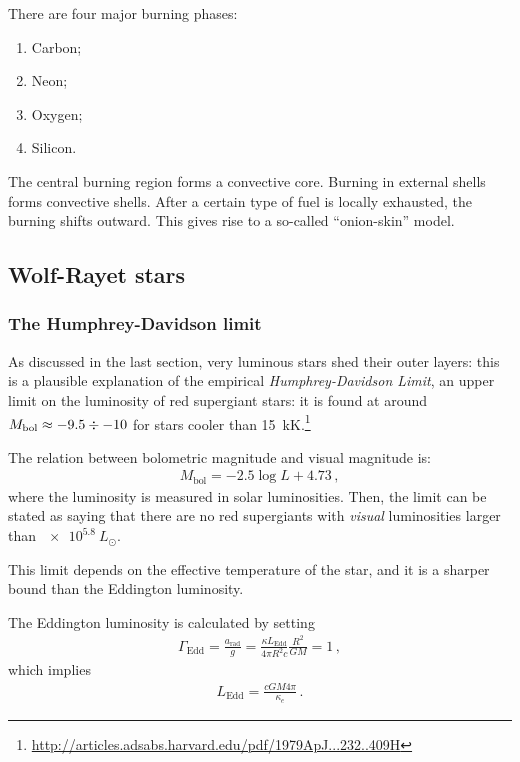 \documentclass[main.tex]{subfiles}
\begin{document}
There are four major burning phases: 
%
\begin{enumerate}
    \item Carbon;
    \item Neon;
    \item Oxygen;
    \item Silicon.
\end{enumerate}

The central burning region forms a convective core.
Burning in external shells forms convective shells.
After a certain type of fuel is locally exhausted, the burning shifts outward.
This gives rise to a so-called ``onion-skin'' model.

\subsection{Wolf-Rayet stars}

\subsubsection{The Humphrey-Davidson limit}

As discussed in the last section, very luminous stars shed their outer layers: this is a plausible explanation of the empirical \emph{Humphrey-Davidson Limit}, an upper limit on the luminosity of red supergiant stars: it is found at around \(M _{\text{bol}} \approx -9.5 \divisionsymbol -10 \) for stars cooler than \SI{15}{kK}.\footnote{\url{http://articles.adsabs.harvard.edu/pdf/1979ApJ...232..409H}}

The relation between bolometric magnitude and visual magnitude is: 
%
\begin{align}
  M _{\text{bol}} = -2.5 \log L + 4.73
\,,
\end{align}
%
where the luminosity is measured in solar luminosities. 
Then, the limit can be stated as saying that there are no red supergiants with \emph{visual} luminosities larger than \(\SI{e5.8}{}L_{\odot}\).

This limit depends on the effective temperature of the star, and it is a sharper bound than the Eddington luminosity.

The Eddington luminosity is calculated by setting
%
\begin{align}
  \Gamma_{\text{Edd}} = \frac{a _{\text{rad}}}{g} = \frac{\kappa L _{\text{Edd}}}{4 \pi R^2 c} \frac{R^2}{GM} =1
\,,
\end{align}
%
which implies 
%
\begin{align}
  L _{\text{Edd}} = \frac{cGM 4 \pi }{\kappa_e}
\,.
\end{align}
\end{document}
